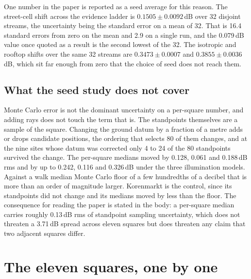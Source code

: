 \documentclass[journal]{IEEEtran}
\begin{document}
One number in the paper is reported as a seed average for this reason. The
street-cell shift across the evidence ladder is $0.1505 \pm 0.0092$\,dB over 32
disjoint streams, the uncertainty being the standard error on a mean of 32. That
is 16.4 standard errors from zero on the mean and 2.9 on a single run, and the
0.079\,dB value once quoted as a result is the second lowest of the 32. The
isotropic and rooftop shifts over the same 32 streams are $0.3473 \pm 0.0007$
and $0.3855 \pm 0.0036$\,dB, which sit far enough from zero that the choice of
seed does not reach them.

\subsection{What the seed study does not cover}

Monte Carlo error is not the dominant uncertainty on a per-square number, and
adding rays does not touch the term that is. The standpoints themselves are a
sample of the square. Changing the ground datum by a fraction of a metre adds or
drops candidate positions, the ordering that selects 80 of them changes, and at
the nine sites whose datum was corrected only 4 to 24 of the 80 standpoints
survived the change. The per-square medians moved by 0.128, 0.061 and 0.188\,dB
rms and by up to 0.242, 0.116 and 0.326\,dB under the three illumination models.
Against a walk median Monte Carlo floor of a few hundredths of a decibel that is
more than an order of magnitude larger. Korenmarkt is the control, since its
standpoints did not change and its medians moved by less than the floor. The
consequence for reading the paper is stated in the body: a per-square median
carries roughly 0.13\,dB rms of standpoint sampling uncertainty, which does not
threaten a 3.71\,dB spread across eleven squares but does threaten any claim
that two adjacent squares differ.

\section{The eleven squares, one by one}
\label{sec:si-sites}
\end{document}
